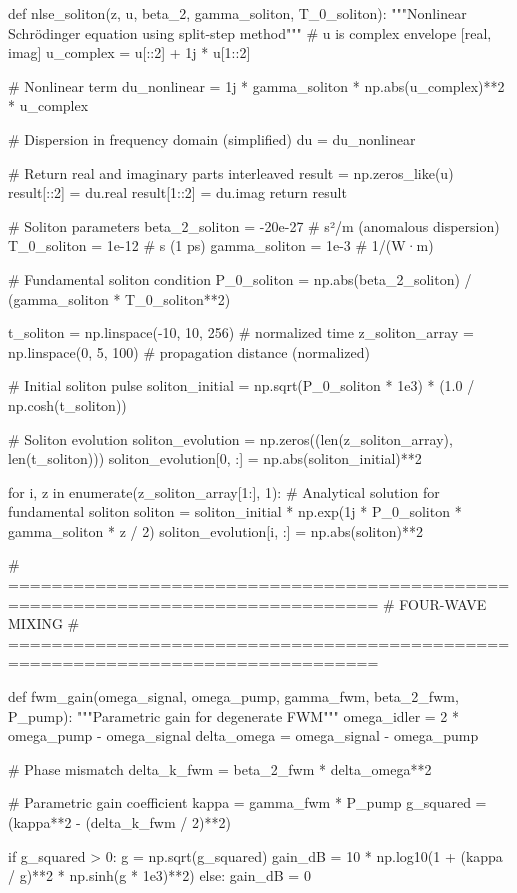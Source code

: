 \documentclass[a4paper, 11pt]{article}
\begin{document}
\begin{pycode}
def nlse_soliton(z, u, beta_2, gamma_soliton, T_0_soliton):
    """Nonlinear Schrödinger equation using split-step method"""
    # u is complex envelope [real, imag]
    u_complex = u[::2] + 1j * u[1::2]

    # Nonlinear term
    du_nonlinear = 1j * gamma_soliton * np.abs(u_complex)**2 * u_complex

    # Dispersion in frequency domain (simplified)
    du = du_nonlinear

    # Return real and imaginary parts interleaved
    result = np.zeros_like(u)
    result[::2] = du.real
    result[1::2] = du.imag
    return result

# Soliton parameters
beta_2_soliton = -20e-27  # s²/m (anomalous dispersion)
T_0_soliton = 1e-12  # s (1 ps)
gamma_soliton = 1e-3  # 1/(W·m)

# Fundamental soliton condition
P_0_soliton = np.abs(beta_2_soliton) / (gamma_soliton * T_0_soliton**2)

t_soliton = np.linspace(-10, 10, 256)  # normalized time
z_soliton_array = np.linspace(0, 5, 100)  # propagation distance (normalized)

# Initial soliton pulse
soliton_initial = np.sqrt(P_0_soliton * 1e3) * (1.0 / np.cosh(t_soliton))

# Soliton evolution
soliton_evolution = np.zeros((len(z_soliton_array), len(t_soliton)))
soliton_evolution[0, :] = np.abs(soliton_initial)**2

for i, z in enumerate(z_soliton_array[1:], 1):
    # Analytical solution for fundamental soliton
    soliton = soliton_initial * np.exp(1j * P_0_soliton * gamma_soliton * z / 2)
    soliton_evolution[i, :] = np.abs(soliton)**2

# ================================================================================
# FOUR-WAVE MIXING
# ================================================================================

def fwm_gain(omega_signal, omega_pump, gamma_fwm, beta_2_fwm, P_pump):
    """Parametric gain for degenerate FWM"""
    omega_idler = 2 * omega_pump - omega_signal
    delta_omega = omega_signal - omega_pump

    # Phase mismatch
    delta_k_fwm = beta_2_fwm * delta_omega**2

    # Parametric gain coefficient
    kappa = gamma_fwm * P_pump
    g_squared = (kappa**2 - (delta_k_fwm / 2)**2)

    if g_squared > 0:
        g = np.sqrt(g_squared)
        gain_dB = 10 * np.log10(1 + (kappa / g)**2 * np.sinh(g * 1e3)**2)
    else:
        gain_dB = 0


\end{pycode}
\end{document}
